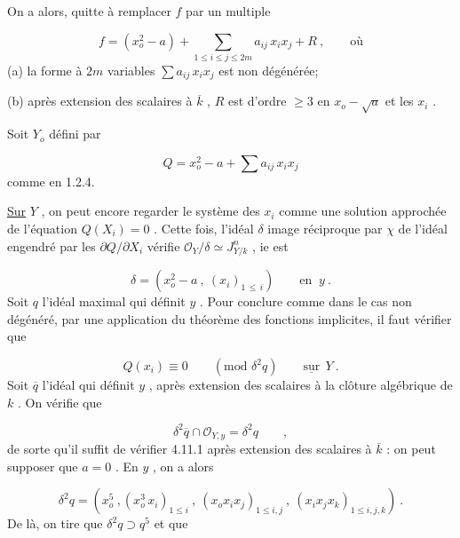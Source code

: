 On a alors, quitte à remplacer $f$ par un multiple

\begin{equation*}
f = (x_o^2 - a) + \sum_{1 \leq i \leq j \leq 2m} a_{ij} \, x_i x_j + R \ , \qquad \mbox{où}
\end{equation*}
(a) la forme à $2m$ variables $\sum a_{ij} \, x_i x_j$ est non dégénérée;

(b) après extension des scalaires à $\overline{k}$ , $R$ est d'ordre $\geq 3$ en $x_o - \sqrt{a}$ et les $x_i$ .



Soit $Y_o$ défini par

\begin{equation*}
Q = x_o^2 - a + \sum a_{ij} \, x_i x_j
\end{equation*}
comme en 1.2.4.

\underline{Sur} $Y$ , on peut encore regarder le système des $x_i$ comme une solution approchée de l'équation $Q(X_i) = 0$ . Cette fois, l'idéal $\delta$ image réciproque par $\chi$ de l'idéal engendré par les $\partial Q/\partial X_i$ vérifie $\mathcal{O}_Y/\delta \simeq J^n_{Y/k}$ , ie est

\begin{equation*}
\delta = (x_o^2 - a \ , \ (x_i)_{1 \, \leq \, i}) \qquad \mbox{en } \ y \ .
\end{equation*}
Soit $q$ l'idéal maximal qui définit $y$ . Pour conclure comme dans le cas non dégénéré, par une application du théorème des fonctions implicites, il faut vérifier que

\begin{equation}\tag{1.2.11.1}
Q(x_i) \equiv 0 \qquad (\mbox{mod } \delta^2 q) \qquad \underline{\mbox{sur}} \ \ Y \ .
\end{equation}
Soit $\overline{q}$ l'idéal qui définit $y$ , après extension des scalaires à la clôture algébrique de $k$ . On vérifie que

\begin{equation*}
\delta^2 \overline{q} \cap \mathcal{O}_{Y,y} = \delta^2 q \qquad ,
\end{equation*}
de sorte qu'il suffit de vérifier 4.11.1 après extension des scalaires à $\overline{k}$ : on peut supposer que $a = 0$ . En $y$ , on a alors

\begin{equation*}
\delta^2 q = (x_o^5 \ , (x_o^3 \, x_i)_{1 \leq i} \ , \ (x_o x_i x_j)_{1 \leq i,j} \ , \ (x_i x_j x_k)_{1 \leq i,j,k}) \ .
\end{equation*}
De là, on tire que $\delta^2 q \supset q^5$ et que

